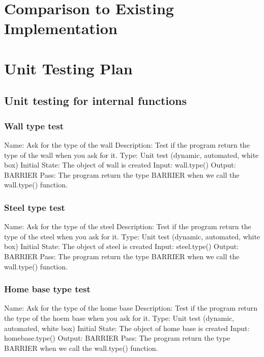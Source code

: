 \documentclass{article}
\begin{document}
\section{Comparison to Existing Implementation}

\section{Unit Testing Plan}
\subsection{Unit testing for internal functions}
\subsubsection{Wall type test}
Name:  Ask for the type of the wall\newline
Description: Test if the program return the type of the wall when you ask for it. \newline
Type: Unit test (dynamic, automated, white box) \newline
Initial State:  The object of wall is created \newline
Input: wall.type()\newline
Output: BARRIER  \newline
Pass:   The program return the type BARRIER when we call the wall.type() function. \newline

\subsubsection{Steel type test}
Name:  Ask for the type of the steel\newline
Description: Test if the program return the type of the steel when you ask for it. \newline
Type: Unit test (dynamic, automated, white box) \newline
Initial State:  The object of steel is created \newline
Input: steel.type()\newline
Output: BARRIER\newline
Pass:  The program return the type BARRIER when we call the wall.type() function. \newline

\subsubsection{Home base type test}
Name:  Ask for the type of the home base\newline
Description: Test if the program return the type of the hoem base when you ask for it. \newline
Type: Unit test (dynamic, automated, white box) \newline
Initial State:  The object of home base is created \newline
Input: homebase.type()\newline
Output: BARRIER\newline
Pass:  The program return the type BARRIER when we call the wall.type() function. \newline
\end{document}

